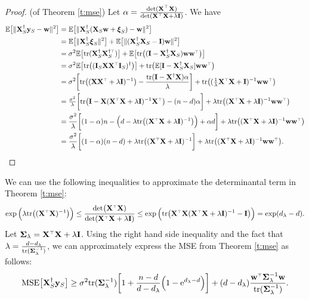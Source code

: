\documentclass[12pt]{sty/colt2019/colt2018-arxiv}
\begin{document}
\begin{proof} (of Theorem \ref{t:mse})
  Let $\alpha = \frac{\det(\X^\top\X)}{\det(\X^\top\X+\lambda\I)}$. We have
  \begin{align*}
    \E\big[\|\X_S^\dagger\y_S - \w\|^2\big]
    &= \E\big[\|\X_S^\dagger(\X_S\w+\xib_S)-\w\|^2\big]\\
    & = \E\big[\|\X_S^\dagger\xib_S\|^2\big] +
      \E\big[\|(\X_S^\dagger\X_S-\I)\w\|^2\big]\\
    &=\sigma^2\E\big[\tr(\X_S^\dagger\X_S^{\dagger\top})\big] +
      \E\big[\tr\big((\I- \X_S^\dagger\X_S)\w\w^\top\big)\big]\\
    &=\sigma^2\E\big[\tr\big((\I_S\X\X^\top\I_S)^\dagger\big)\big] +
      \tr\big(\E[\I- \X_S^\dagger\X_S]\w\w^\top\big)\\
    &= \sigma^2\bigg[\tr\big((\X\X^\top+\lambda\I)^{-1}\big) -
      \frac{\tr(\I-\X^\dagger\X)\alpha}{\lambda}\bigg]
      +
      \tr\big((\tfrac1\lambda\X^\top\X+\I)^{-1}\w\w^\top\big)\\
    & =
      \tfrac{\sigma^2}{\lambda}\bigg[\tr\big(\I-\X(\X^\top\X+\lambda\I)^{-1}\X^\top\big)
   -         (n-d)\alpha\bigg]
      + \lambda\tr\big((\X^\top\X+\lambda\I)^{-1}\w\w^\top\big)\\
    &=\frac{\sigma^2}\lambda\bigg[(1-\alpha)n -
      \Big(d-\lambda\tr\big((\X^\top\X+\lambda\I)^{-1}\big)\Big) +
      \alpha d\bigg] +
      \lambda\tr\big((\X^\top\X+\lambda\I)^{-1}\w\w^\top\big)\\
    &=\frac{\sigma^2}\lambda\bigg[(1-\alpha)(n-d) +\lambda\tr\big((\X^\top\X+\lambda\I)^{-1}\bigg]
     + \lambda\tr\big((\X^\top\X+\lambda\I)^{-1}\w\w^\top\big).
  \end{align*}
\end{proof}
We can use the following inequalities to approximate the determinantal
term in Theorem \ref{t:mse}:
\begin{align*}
\exp\Big(\lambda\tr\big((\X^\top\X)^{-1}\big)\Big)
\leq  \frac{\det\!\big(\X^\top\X)}{\det(\X^\top\X+\lambda\I)}
  \leq \exp\Big(\tr\big(\X^\top\X(\X^\top\X+\lambda\I)^{-1} -
  \I\big)\Big) = \exp(d_\lambda-d).
\end{align*}
Let $\Sigmab_{\lambda} = \X^\top\X+\lambda\I$. Using the right hand
side inequality and the fact that $\lambda = 
\frac{d-d_\lambda}{\mathrm{tr}(\mathbf{\Sigma}_\lambda^{-1})}$, we can
approximately express the MSE from Theorem \ref{t:mse} as
follows:
\begin{align*}
  \MSE{\X_S^\dagger\y_S} \geq \sigma^2\tr(\Sigmab_\lambda^{-1})\bigg[1 +
  \frac{n-d}{d-d_\lambda}\Big(1-\ee^{d_\lambda-d}\Big)\bigg] + (d-d_\lambda)\frac{\w^\top\Sigmab_\lambda^{-1}\w}{\tr(\Sigmab_\lambda^{-1})}.
\end{align*}
\end{document}
